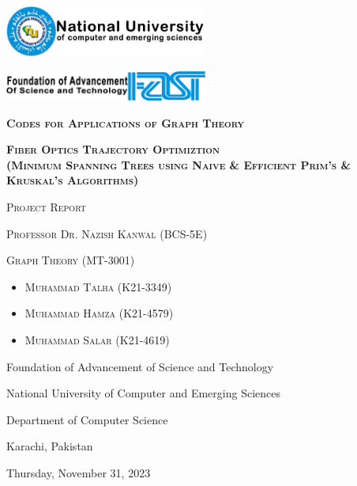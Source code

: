 \documentclass[a4paper, 10pt, twocolumn]{article}
\begin{document}
\begin{titlepage}
    \centering
    \vspace{3.5cm}
    \includegraphics[width=0.5\textwidth]{NU-logo.jpg}\par\vspace{1cm}
    \includegraphics[width=0.5\textwidth]{FAST.png}\par\vspace{1cm}
    \vspace{1cm}
    {\scshape\LARGE\textbf {Codes for Applications of Graph Theory} \par}
    \vspace{1cm}
    {\scshape\LARGE\textbf {Fiber Optics Trajectory Optimiztion\\(Minimum Spanning Trees using Naive \& Efficient Prim's \& Kruskal's Algorithms)} \par}
    \vspace{1cm}
    {\scshape\Large Project Report \par}
    \vspace{1cm}
    {\scshape\Large Professor Dr. Nazish Kanwal (BCS-5E) \par}
    \vspace{1cm}
    {\scshape\Large Graph Theory (MT-3001) \par}
    \vspace{1cm}
    \begin{itemize}
    \item {\scshape\Large Muhammad Talha (K21-3349) \par}
    \vspace{0.25cm}
    \item {\scshape\Large Muhammad Hamza (K21-4579) \par}
    \vspace{0.25cm}
    \item {\scshape\Large Muhammad Salar (K21-4619) \par}
    \end{itemize}
    \vfill
    \vspace{1cm}    
    {Foundation of Advancement of Science and Technology \par}
    {National University of Computer and Emerging Sciences \par}
    {Department of Computer Science \par}
    {Karachi, Pakistan \par}
    {Thursday, November 31, 2023 \par}
\end{titlepage}
\end{document}
